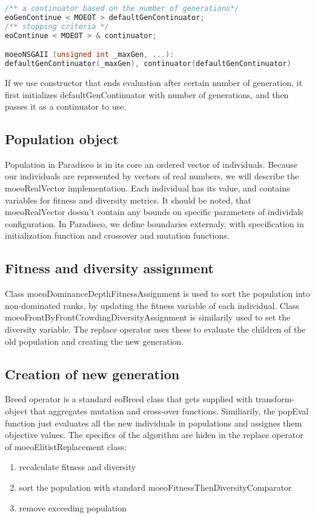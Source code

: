 \documentclass[12pt,oneside]{fithesis2}
\begin{document}
\begin{lstlisting}[language=C++,label=composition,caption=Object composition in Paradiseo]
/** a continuator based on the number of generations*/
eoGenContinue < MOEOT > defaultGenContinuator;
/** stopping criteria */
eoContinue < MOEOT > & continuator;

moeoNSGAII (unsigned int _maxGen, ...):
defaultGenContinuator(_maxGen), continuator(defaultGenContinuator)
\end{lstlisting}

If we use constructor that ends evaluation after certain number of generation, it first initializes defaultGenContinuator with number of generations, and then passes it as a continuator to use. 

\subsection{Population object}
Population in Paradiseo is in its core an ordered vector of individuals. Because our individuals are represented by vectors of real numbers, we will describe the moeoRealVector implementation. Each individual has its value, and contains variables for fitness and diversity metrics. It should be noted, that moeoRealVector doesn't contain any bounds on specific parameters of individals configuration. In Paradiseo, we define boundaries externaly, with specification in initialization function and crossover and mutation functions. 

\subsection{Fitness and diversity assignment}

Class moeoDominanceDepthFitnessAssignment is used to sort the population into non-dominated ranks, by updating the fitness variable of each individual. Class moeoFrontByFrontCrowdingDiversityAssignment is similarily used to set the diversity variable. The replace operator uses these to evaluate the children of the old population and creating the new generation.

\subsection{Creation of new generation}

Breed operator is a standard eoBreed class that gets supplied with transform-object that aggregates mutation and cross-over functions. Similiarily, the popEval function just evaluates all the new individuals in populations and assignes them objective values. The specifics of the algorithm are hiden in the replace operator of moeoElitistReplacement class:
\begin{enumerate}
\item recalculate fitness and diversity
\item sort the population with standard moeoFitnessThenDiversityComparator
\item remove exceeding population
\end{enumerate}
\end{document}
